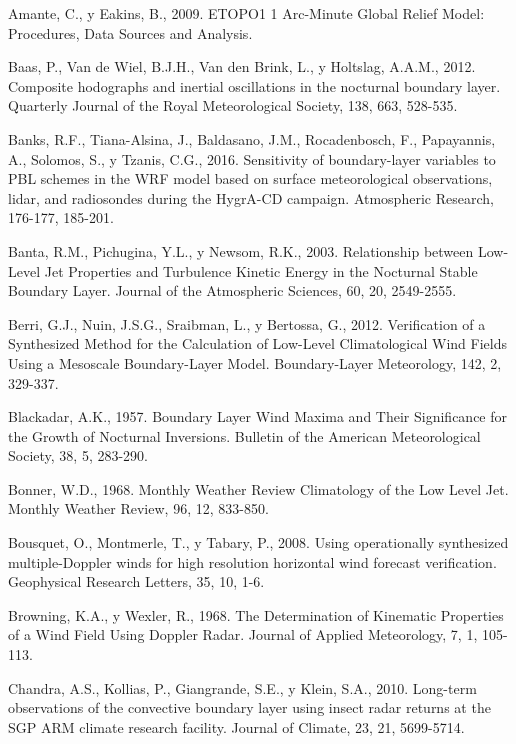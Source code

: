 \documentclass[12pt,spanish,oneside, a4paper]{book}
\begin{document}
\hypertarget{ref-Amante2009}{}
Amante, C., y Eakins, B., 2009. ETOPO1 1 Arc-Minute Global Relief Model:
Procedures, Data Sources and Analysis.

\hypertarget{ref-Baas2012}{}
Baas, P., Van de Wiel, B.J.H., Van den Brink, L., y Holtslag, A.A.M.,
2012. Composite hodographs and inertial oscillations in the nocturnal
boundary layer. Quarterly Journal of the Royal Meteorological Society,
138, 663, 528-535.

\hypertarget{ref-Banks2016}{}
Banks, R.F., Tiana-Alsina, J., Baldasano, J.M., Rocadenbosch, F.,
Papayannis, A., Solomos, S., y Tzanis, C.G., 2016. Sensitivity of
boundary-layer variables to PBL schemes in the WRF model based on
surface meteorological observations, lidar, and radiosondes during the
HygrA-CD campaign. Atmospheric Research, 176-177, 185-201.

\hypertarget{ref-Banta2003}{}
Banta, R.M., Pichugina, Y.L., y Newsom, R.K., 2003. Relationship between
Low-Level Jet Properties and Turbulence Kinetic Energy in the Nocturnal
Stable Boundary Layer. Journal of the Atmospheric Sciences, 60, 20,
2549-2555.

\hypertarget{ref-Berri2012}{}
Berri, G.J., Nuin, J.S.G., Sraibman, L., y Bertossa, G., 2012.
Verification of a Synthesized Method for the Calculation of Low-Level
Climatological Wind Fields Using a Mesoscale Boundary-Layer Model.
Boundary-Layer Meteorology, 142, 2, 329-337.

\hypertarget{ref-Blackadar1957}{}
Blackadar, A.K., 1957. Boundary Layer Wind Maxima and Their Significance
for the Growth of Nocturnal Inversions. Bulletin of the American
Meteorological Society, 38, 5, 283-290.

\hypertarget{ref-Bonner1968}{}
Bonner, W.D., 1968. Monthly Weather Review Climatology of the Low Level
Jet. Monthly Weather Review, 96, 12, 833-850.

\hypertarget{ref-Bousquet2008}{}
Bousquet, O., Montmerle, T., y Tabary, P., 2008. Using operationally
synthesized multiple-Doppler winds for high resolution horizontal wind
forecast verification. Geophysical Research Letters, 35, 10, 1-6.

\hypertarget{ref-Browning1968}{}
Browning, K.A., y Wexler, R., 1968. The Determination of Kinematic
Properties of a Wind Field Using Doppler Radar. Journal of Applied
Meteorology, 7, 1, 105-113.

\hypertarget{ref-Chandra2010}{}
Chandra, A.S., Kollias, P., Giangrande, S.E., y Klein, S.A., 2010.
Long-term observations of the convective boundary layer using insect
radar returns at the SGP ARM climate research facility. Journal of
Climate, 23, 21, 5699-5714.
\end{document}
